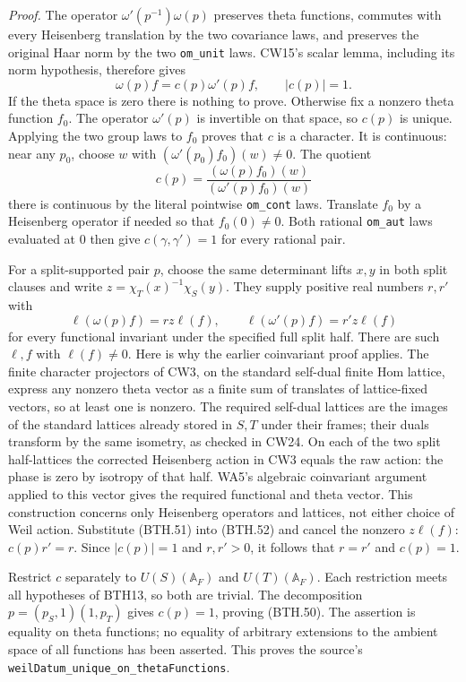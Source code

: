 \emph{Proof.}
The operator \(\omega'(p^{-1})\omega(p)\) preserves
theta functions, commutes with every Heisenberg
translation by the two covariance laws, and preserves
the original Haar norm by the two \texttt{om\_\allowbreak unit}
laws.  CW15's scalar lemma, including its norm
hypothesis, therefore gives
\[
          \omega(p)f=c(p)\omega'(p)f,\qquad |c(p)|=1.          \tag{BTH.51}
\]
If the theta space is zero there is nothing to prove.
Otherwise fix a nonzero theta function \(f_0\).
The operator \(\omega'(p)\) is invertible on that
space, so \(c(p)\) is unique.  Applying the two group
laws to \(f_0\) proves that \(c\) is a character.
It is continuous: near any \(p_0\), choose \(w\) with
\((\omega'(p_0)f_0)(w)\ne0\).  The quotient
\[
       c(p)=\frac{(\omega(p)f_0)(w)}
                        {(\omega'(p)f_0)(w)}
\]
there is continuous by the literal pointwise
\texttt{om\_\allowbreak cont} laws.
Translate \(f_0\) by a Heisenberg operator if needed
so that \(f_0(0)\ne0\).  Both rational
\texttt{om\_\allowbreak aut} laws evaluated at \(0\) then give
\(c(\gamma,\gamma')=1\) for every rational pair.

For a split-supported pair \(p\), choose the same
determinant lifts \(x,y\) in both split clauses and
write \(z=\chi_T(x)^{-1}\chi_S(y)\).
They supply positive real numbers \(r,r'\) with
\[
 \ell(\omega(p)f)=rz\ell(f),\qquad
 \ell(\omega'(p)f)=r'z\ell(f)                                \tag{BTH.52}
\]
for every functional invariant under the specified
full split half.  There are such \(\ell,f\) with
\(\ell(f)\ne0\).
Here is why the earlier coinvariant proof applies.
The finite character projectors of CW3, on the
standard self-dual finite Hom lattice, express any
nonzero theta vector as a finite sum of translates
of lattice-fixed vectors, so at least one is nonzero.
The required self-dual lattices are the images of
the standard lattices already stored in \(S,T\)
under their frames; their duals transform by the
same isometry, as checked in CW24.
On each of the two split half-lattices the corrected
Heisenberg action in CW3 equals the raw action:
the phase is zero by isotropy of that half.
WA5's algebraic coinvariant argument applied to
this vector gives the required functional and
theta vector.  This construction concerns only
Heisenberg operators and lattices, not either
choice of Weil action.
Substitute (BTH.51) into (BTH.52) and cancel
the nonzero \(z\ell(f)\): \(c(p)r'=r\).
Since \(|c(p)|=1\) and \(r,r'>0\), it follows
that \(r=r'\) and \(c(p)=1\).

Restrict \(c\) separately to \(U(S)(\mathbb A_F)\)
and \(U(T)(\mathbb A_F)\).  Each restriction meets
all hypotheses of BTH13, so both are trivial.
The decomposition \(p=(p_S,1)(1,p_T)\) gives
\(c(p)=1\), proving (BTH.50).
The assertion is equality on theta functions;
no equality of arbitrary extensions to the ambient
space of all functions has been asserted.
This proves the source's
\texttt{weil\allowbreak Datum\_\allowbreak unique\_\allowbreak on\_\allowbreak theta\allowbreak Functions}.

